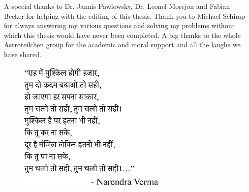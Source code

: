 A special thanks to Dr. Jannis Pawlowsky, Dr. Leonel Morejon and Fabian Becker for helping with the editing of this thesis. Thank you to Michael Schimp for always answering my various questions and solving my problems without which this thesis would have never been completed. A big thanks to the whole Astroteilchen group for the academic and moral support and all the laughs we have shared. 

\begin{figure}[h!]
    \centering
    \includegraphics[width=0.65\textwidth]{thesis_figures/Poem_acknowledge.pdf}
    \caption*{}
  \end{figure}

